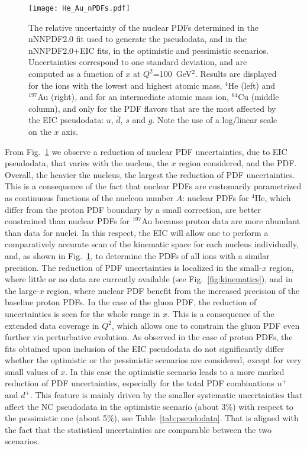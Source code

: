\documentclass[11pt,a4paper]{article}
\begin{document}
\begin{figure}[!t]
  \centering
  \texttt{[image: He\_Au\_nPDFs.pdf]}
  \caption{The relative uncertainty of the nuclear PDFs determined in the
  nNNPDF2.0 fit used to generate the pseudodata, and in the nNNPDF2.0+EIC fits,
  in the optimistic and pessimistic scenarios. Uncertainties correspond to one
  standard deviation, and are computed as a function of $x$ at
  $Q^2$=100~GeV$^2$. Results are displayed for the ions with the lowest and
  highest atomic mass, $^4$He (left) and $^{197}$Au (right), and for an
  intermediate atomic mass ion, $^{64}$Cu (middle column), and only for the
  PDF flavors that are the most affected by the EIC pseudodata: $u$, $\bar{d}$,
  $s$ and $g$. Note the use of a log/linear scale on the $x$ axis.}
  \label{fig:npdfs}
\end{figure}

From Fig.~\ref{fig:npdfs} we observe a reduction of nuclear
PDF uncertainties, due to EIC pseudodata, that varies with the nucleus, the
$x$ region considered, and the PDF. Overall, the heavier the nucleus,
the largest the reduction of PDF uncertainties. This is a consequence of the
fact that nuclear PDFs are customarily parametrized as continuous functions
of the nucleon number $A$: nuclear PDFs for $^4$He, which differ from the proton
PDF boundary by a small correction, are better constrained than nuclear PDFs
for $^{197}$Au because proton data are more abundant than data for nuclei.
In this respect, the EIC will allow one to perform a comparatively accurate
scan of the kinematic space for each nucleus individually, and, as shown in
Fig.~\ref{fig:npdfs}, to determine the PDFs of all ions with a similar
precision. The reduction of PDF uncertainties is localized in the small-$x$
region, where little or no data are currently available
(see Fig.~\ref{fig:kinematics}), and
in the large-$x$ region, where nuclear PDF benefit from the increased precision
of the baseline proton PDFs. In the case of the gluon PDF, the reduction of
uncertainties is seen for the whole range in $x$. This is a consequence of the
extended data coverage in $Q^2$, which allows one to constrain the gluon PDF
even further via perturbative evolution. As observed in the case of
proton PDFs, the fits obtained upon inclusion of the EIC pseudodata do not
significantly differ whether the optimistic or the pessimistic scenarios are
considered, except for very small values of $x$. In this case the optimistic
scenario leads to a more marked reduction of PDF uncertainties, especially for
the total PDF combinations $u^+$ and $d^+$. This feature is mainly driven by the
smaller systematic uncertainties that affect the NC pseudodata in the optimistic
scenario (about 3\%) with respect to the pessimistic one (about 5\%), see
Table~\ref{tab:pseudodata}. That is aligned with the fact that the statistical
uncertainties are comparable between the two scenarios. 
\end{document}
